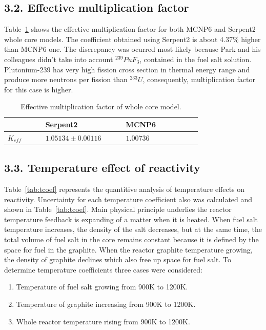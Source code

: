 \documentclass{anstrans}
\begin{document}
\subsection{3.2. Effective multiplication factor}
Table~\ref{tab:keff} shows the effective multiplication factor for both MCNP6 and Serpent2 whole core models. The coefficient obtained using Serpent2 is about 4.37\% higher than MCNP6 one. The discrepancy was ocurred most likely because Park and his colleagues didn't take into account $^{239}PuF_3$, contained in the fuel salt solution. Plutonium-239 has very high fission cross section in thermal energy range and produce more neutrons per fission than $^{233}U$, consequently, multiplication factor for this case is higher.
\captionsetup[table]{
  labelsep = newline,
  name = TABLE, 
  justification=justified,
  singlelinecheck=false,%
  labelsep=colon,%
  skip = \medskipamount}
\begin{table}[h!]
\begin{tabular}{p{0.15\linewidth} p{0.3\linewidth} p{0.3\linewidth}} \toprule
      & Serpent2      & MCNP6 \cite{park_whole_2015}          
\\ \midrule
$K_{eff}$  & $1.05134\pm0.00116$ & $1.00736$
\\
\bottomrule
\end{tabular}
  \caption{Effective multiplication factor of whole core model.}
  \label{tab:keff}
\end{table}
\subsection{3.3. Temperature effect of reactivity}
Table~\ref{tab:tcoef} represents the quantitive analysis of temperature effects on reactivity. Uncertainty for each temperature coefficient also was calculated and shown in Table~\ref{tab:tcoef}. Main physical principle underlies the reactor temperature feedback is expanding of a matter when it is heated. When fuel salt temperature increases, the density of the salt decreases, but at the same time, the total volume of fuel salt in the core remains constant because it is defined by the space for fuel in the graphite. When the reactor graphite temperature growing, the density of graphite declines which also free up space for fuel salt. To determine temperature coefficients three cases were considered:
\begin{enumerate}  
\item Temperature of fuel salt growing from 900K to 1200K.
\item Temperature of graphite increasing from 900K to 1200K. 
\item Whole reactor temperature rising from 900K to 1200K.
\end{enumerate}
\end{document}
